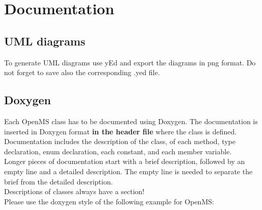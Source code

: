 \documentclass[a4]{article}
\begin{document}
\section{Documentation}

\subsection{UML diagrams}
To generate UML diagrams use yEd and export the diagrams in png format. Do not 
forget to save also the corresponding .yed file.


\subsection{Doxygen}
Each OpenMS class has to be documented using Doxygen. The documentation is
inserted in Doxygen format \textbf{in the header file} where the class is
defined.  Documentation includes the description of the class, of each method,
type declaration, enum declaration, each constant, and each member variable.\\
Longer pieces of documentation start with a brief description, followed
by an empty line and a detailed description. The empty line is needed to separate 
the brief from the detailed description.\\
Descriptions of classes always have a \@brief section!\\
Please use the doxygen style of the following example for OpenMS:
\end{document}
